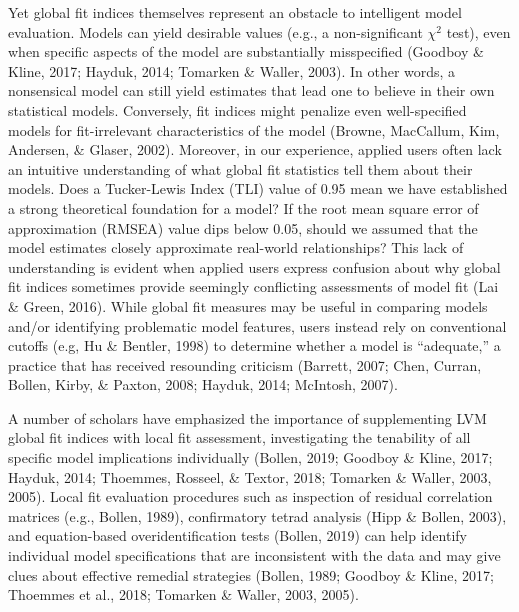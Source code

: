 \documentclass[
  english,
  man]{apa6}
\begin{document}
Yet global fit indices themselves represent an obstacle to intelligent model evaluation. Models can yield desirable values (e.g., a non-significant \(\chi^2\) test), even when specific aspects of the model are substantially misspecified (Goodboy \& Kline, 2017; Hayduk, 2014; Tomarken \& Waller, 2003). In other words, a nonsensical model can still yield estimates that lead one to believe in their own statistical models. Conversely, fit indices might penalize even well-specified models for fit-irrelevant characteristics of the model (Browne, MacCallum, Kim, Andersen, \& Glaser, 2002). Moreover, in our experience, applied users often lack an intuitive understanding of what global fit statistics tell them about their models. Does a Tucker-Lewis Index (TLI) value of 0.95 mean we have established a strong theoretical foundation for a model? If the root mean square error of approximation (RMSEA) value dips below 0.05, should we assumed that the model estimates closely approximate real-world relationships? This lack of understanding is evident when applied users express confusion about why global fit indices sometimes provide seemingly conflicting assessments of model fit (Lai \& Green, 2016). While global fit measures may be useful in comparing models and/or identifying problematic model features, users instead rely on conventional cutoffs (e.g, Hu \& Bentler, 1998) to determine whether a model is ``adequate,'' a practice that has received resounding criticism (Barrett, 2007; Chen, Curran, Bollen, Kirby, \& Paxton, 2008; Hayduk, 2014; McIntosh, 2007).

A number of scholars have emphasized the importance of supplementing LVM global fit indices with local fit assessment, investigating the tenability of all specific model implications individually (Bollen, 2019; Goodboy \& Kline, 2017; Hayduk, 2014; Thoemmes, Rosseel, \& Textor, 2018; Tomarken \& Waller, 2003, 2005). Local fit evaluation procedures such as inspection of residual correlation matrices (e.g., Bollen, 1989), confirmatory tetrad analysis (Hipp \& Bollen, 2003), and equation-based overidentification tests (Bollen, 2019) can help identify individual model specifications that are inconsistent with the data and may give clues about effective remedial strategies (Bollen, 1989; Goodboy \& Kline, 2017; Thoemmes et al., 2018; Tomarken \& Waller, 2003, 2005).
\end{document}
